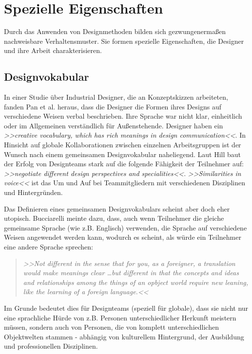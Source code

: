 \section{Spezielle Eigenschaften}
Durch das Anwenden von Designmethoden bilden sich gezwungenermaßen nachweisbare Verhaltensmuster. Sie formen spezielle Eigenschaften, die Designer und ihre Arbeit charakterisieren.

\subsection{Designvokabular} 
In einer Studie über Industrial Designer, die an Konzeptskizzen arbeiteten, fanden Pan et al. \citep{Pan:2002} heraus, dass die Designer die Formen ihres Designs auf verschiedene Weisen verbal beschrieben. Ihre Sprache war nicht klar, einheitlich oder im Allgemeinen verständlich für Außenstehende. Designer haben ein \emph{>>creative vocabulary, which has rich meanings in design communication<<}\citep{Pan:2002}. In Hinsicht auf globale Kollaborationen zwischen einzelnen Arbeitsgruppen ist der Wunsch nach einem gemeinsamen Designvokabular naheliegend. Laut Hill \citep{Hill:2001} baut der Erfolg von Designteams stark auf die folgende Fähigkeit der Teilnehmer auf: \emph{>>negotiate different design perspectives and specialities<<}. \emph{>>Similarities in voice<<} ist das Um und Auf bei Teammitgliedern mit verschiedenen Disziplinen und Hintergründen.

\medskip Das Definieren eines gemeinsamen Designvokabulars scheint aber doch eher utopisch. Bucciarelli meinte dazu, dass, auch wenn Teilnehmer die gleiche gemeinsame Sprache (wie z.B. Englisch) verwenden, die Sprache auf verschiedene Weisen angewendet werden kann, wodurch es scheint, als würde ein Teilnehmer eine andere Sprache sprechen:

\begin{quote}
	\textsl{>>Not different in the sense that for you, as a foreigner, a translation would make meanings clear \ldots but different in that the concepts and ideas and relationships among the things of an opbject world require new leaning, like the learning of a foreign language.<<}
\begin{flushright}\citep{Bucciarelli:2002}\end{flushright}
\end{quote}

Im Grunde bedeutet dies für Designteams (speziell für globale), dass sie nicht nur eine sprachliche Hürde von z.B. Personen unterschiedlicher Herkunft meistern müssen, sondern auch von Personen, die von komplett unterschiedlichen Objektwelten stammen - abhängig von kulturellem Hintergrund, der Ausbildung und professionellen Disziplinen.

